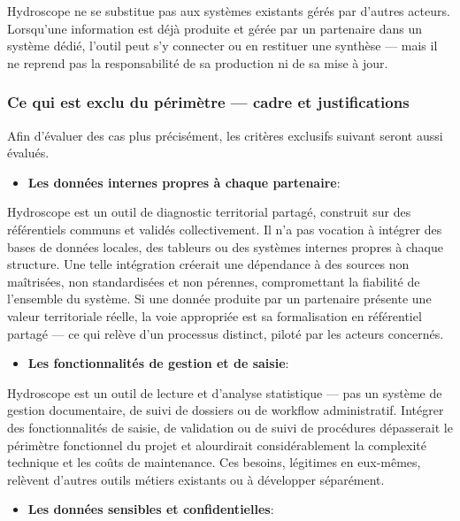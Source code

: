 \documentclass[
  french,
  11pt,
]{article}
\providecommand{\tightlist}{%
  \setlength{\itemsep}{0pt}\setlength{\parskip}{0pt}}
\begin{document}
Hydroscope ne se substitue pas aux systèmes existants gérés par d'autres
acteurs. Lorsqu'une information est déjà produite et gérée par un
partenaire dans un système dédié, l'outil peut s'y connecter ou en
restituer une synthèse --- mais il ne reprend pas la responsabilité de
sa production ni de sa mise à jour.

\subsubsection{Ce qui est exclu du périmètre --- cadre et
justifications}\label{ce-qui-est-exclu-du-puxe9rimuxe8tre-cadre-et-justifications}

Afin d'évaluer des cas plus précisément, les critères exclusifs suivant
seront aussi évalués.

\begin{itemize}
\tightlist
\item
  \textbf{Les données internes propres à chaque partenaire}:
\end{itemize}

Hydroscope est un outil de diagnostic territorial partagé, construit sur
des référentiels communs et validés collectivement. Il n'a pas vocation
à intégrer des bases de données locales, des tableurs ou des systèmes
internes propres à chaque structure. Une telle intégration créerait une
dépendance à des sources non maîtrisées, non standardisées et non
pérennes, compromettant la fiabilité de l'ensemble du système. Si une
donnée produite par un partenaire présente une valeur territoriale
réelle, la voie appropriée est sa formalisation en référentiel partagé
--- ce qui relève d'un processus distinct, piloté par les acteurs
concernés.

\begin{itemize}
\tightlist
\item
  \textbf{Les fonctionnalités de gestion et de saisie}:
\end{itemize}

Hydroscope est un outil de lecture et d'analyse statistique --- pas un
système de gestion documentaire, de suivi de dossiers ou de workflow
administratif. Intégrer des fonctionnalités de saisie, de validation ou
de suivi de procédures dépasserait le périmètre fonctionnel du projet et
alourdirait considérablement la complexité technique et les coûts de
maintenance. Ces besoins, légitimes en eux-mêmes, relèvent d'autres
outils métiers existants ou à développer séparément.

\begin{itemize}
\tightlist
\item
  \textbf{Les données sensibles et confidentielles}:
\end{itemize}
\end{document}
